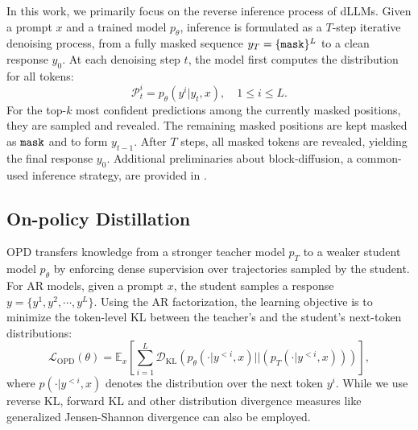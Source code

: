 \documentclass{article}
\begin{document}
In this work, we primarily focus on the reverse inference process of dLLMs. Given a prompt $x$ and a trained model $p_\theta$, inference is formulated as a $T$-step iterative denoising process, from a fully masked sequence $y_T = \{{\texttt{mask}}\}^L$ to a clean response $y_0$. At each denoising step $t$, the model first computes the distribution for all tokens:
\begin{equation}
    \mathcal{P}_{t}^i = p_\theta(y^i|y_t, x), \quad 1 \leq i \leq L.
\end{equation}
For the top-$k$ most confident predictions among the currently masked positions, they are sampled and revealed. The remaining masked positions are kept masked as ${\texttt{mask}}$ and to form $y_{t-1}$. After $T$ steps, all masked tokens are revealed, yielding the final response $y_0$. Additional preliminaries about block-diffusion, a common-used inference strategy, are provided in .


\subsection{On-policy Distillation}


OPD transfers knowledge from a stronger teacher model $p_T$ to a weaker student model $p_\theta$ by enforcing dense supervision over trajectories sampled by the student. For AR models, given a prompt $x$, the student samples a response $y = \{y^1, y^2, \cdots, y^L\}$. Using the AR factorization, the learning objective is to minimize the token-level KL between the teacher's and the student's next-token distributions:
\begin{equation}
    \mathcal{L}_\text{OPD} (\theta) = \mathbb{E}_x \left[ \sum_{i=1}^L \mathcal{D}_\text{KL} \left(p_\theta \left( \cdot | y^{<i}, x  \right) || \left( p_T \left( \cdot | y^{<i}, x \right) \right) \right) \right],
\label{eq4}
\end{equation}
where $p(\cdot | y^{<i}, x)$ denotes the distribution over the next token $y^i$. While we use reverse KL, forward KL and other distribution divergence measures like generalized Jensen-Shannon divergence \citep{agarwal2024policy} can also be employed.
\end{document}
